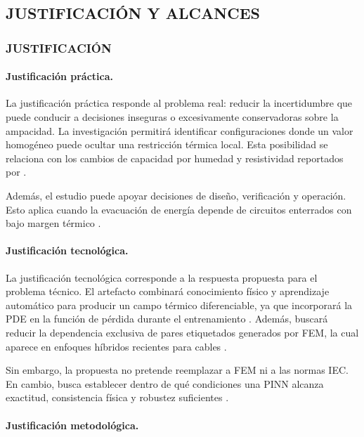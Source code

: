\subsection{JUSTIFICACIÓN Y ALCANCES}

\subsubsection{JUSTIFICACIÓN}

\paragraph{Justificación práctica.}

La justificación práctica responde al problema real: reducir la incertidumbre que puede conducir a decisiones inseguras o excesivamente conservadoras sobre la ampacidad. La investigación permitirá identificar configuraciones donde un valor homogéneo puede ocultar una restricción térmica local. Esta posibilidad se relaciona con los cambios de capacidad por humedad y resistividad reportados por \textcite[1,6--9]{khumalo2025}.

Además, el estudio puede apoyar decisiones de diseño, verificación y operación. Esto aplica cuando la evacuación de energía depende de circuitos enterrados con bajo margen térmico \parencite[14842,14851]{fariz2026}.

\paragraph{Justificación tecnológica.}

La justificación tecnológica corresponde a la respuesta propuesta para el problema técnico. El artefacto combinará conocimiento físico y aprendizaje automático para producir un campo térmico diferenciable, ya que incorporará la PDE en la función de pérdida durante el entrenamiento \parencite[686--690]{raissi2019}. Además, buscará reducir la dependencia exclusiva de pares etiquetados generados por FEM, la cual aparece en enfoques híbridos recientes para cables \parencite[1--3,12]{aldulaimi2024}.

Sin embargo, la propuesta no pretende reemplazar a FEM ni a las normas IEC. En cambio, busca establecer dentro de qué condiciones una PINN alcanza exactitud, consistencia física y robustez suficientes \parencite[93--99]{cigre2025}.

\paragraph{Justificación metodológica.}

